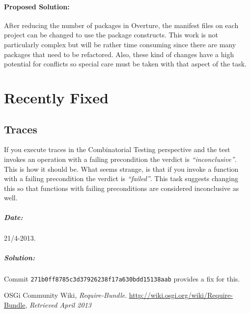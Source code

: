\documentclass[11pt]{overturerep} \usepackage{t1enc,times,a4,t1enc}
\begin{document}
\subsubsection{Proposed Solution:} After reducing the number of packages in
Overture, the manifest files on each project can be changed to use the
package constructs. This work is not particularly complex but will be
rather time consuming since there are many packages that need to be
refactored. Also, these kind of changes have a high potential for conflicts
so special care must be taken with that aspect of the task.







\chapter{Recently Fixed}

\section{Traces}

If you execute traces in the Combinatorial Testing perspective and the test
invokes an operation with a failing precondition the verdict is
\textit{``inconclusive''}. This is how it should be. What seems strange, is
that if you invoke a function with a failing precondition the verdict is
\textit{``failed''}. This task suggests changing this so that functions with
failing preconditions are considered inconclusive as well.

\paragraph{Date:} 21/4-2013.

\paragraph{Solution:} Commit \texttt{271b0ff8785c3d37926238f17a630bdd15138aab}
provides a fix for this.



\begin{thebibliography}{9}

     OSGi Community Wiki, \emph{Require-Bundle}.
        \url{http://wiki.osgi.org/wiki/Require-Bundle}, \emph{Retrieved April 2013}

\end{thebibliography} 
\end{document}
